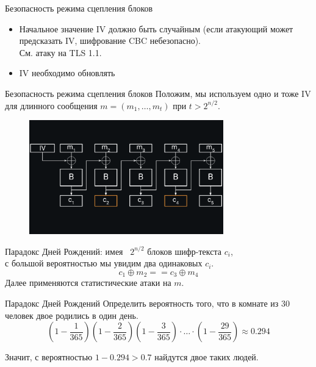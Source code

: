\documentclass[usenames,dvipsnames,8pt,aspectratio=169]{beamer}
\begin{document}
\begin{frame}{Безопасность режима сцепления блоков}
\Large
\begin{itemize}
\itemsep 10pt
\item Начальное значение IV должно быть {\color{Orange} случайным} (если атакующий может предсказать IV, шифрование CBC небезопасно).\\ 
См. атаку на TLS 1.1.
 
\item{\color{Orange} IV необходимо обновлять}  \\

\end{itemize}
\end{frame}

\begin{frame}{Безопасность режима сцепления блоков}
\Large
	Положим, мы используем одно и тоже IV для длинного сообщения $m=(m_1, \ldots, m_t)$ при $t> 2^{n/2}$.
	\vspace{-10pt}
	\begin{figure}
		\includegraphics[width=0.75\textwidth]{CBC_1}
	\end{figure}
\vspace{-40pt}
{\color{Orange}Парадокс Дней Рождений:} имея ~$2^{n/2}$ блоков шифр-текста $c_i$, \\ с большой вероятностью мы увидим два одинаковых $c_i$.
\Large
\[
	c_1 \oplus m_2 == c_3 \oplus m_4
\]
Далее применяются статистические атаки на $m$.
\end{frame}

\begin{frame}{Парадокс Дней Рождений}
\Large
	{\color{Orange} Определить вероятность того, что в комнате из 30 человек двое родились в один день.}\\
	\pause
	\vspace{30pt}
	\[
		\left(1 - \frac{1}{365}\right)  \left(1 - \frac{2}{365}\right) \left(1 - \frac{3}{365}\right) \cdot \ldots \cdot \left(1 - \frac{29}{365}\right)  \approx 0.294
	\]
	
	\vspace{30pt}
	Значит, с вероятностью $1-0.294>0.7$ найдутся двое таких людей.
	
\end{frame}
\end{document}
